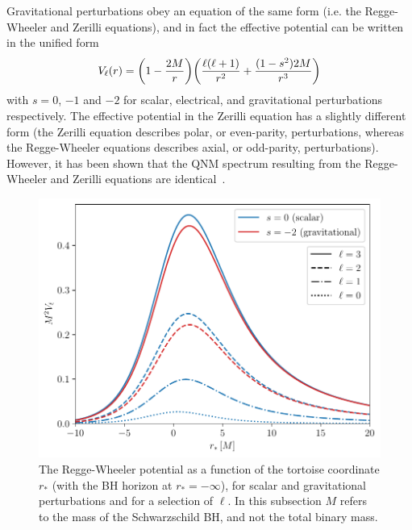Gravitational perturbations obey an equation of the same form (i.e. the Regge-Wheeler and Zerilli equations), and in fact the effective potential can be written in the unified form
\begin{equation}
    V_\ell(r) = \qty( 1 - \frac{2M}{r} ) \qty( \frac{\ell (\ell + 1)}{r^2} + \frac{(1 - s^2)2M}{r^3} )
\end{equation}
with $s = 0$, $-1$ and $-2$ for scalar, electrical, and gravitational perturbations respectively. 
The effective potential in the Zerilli equation has a slightly different form (the Zerilli equation describes polar, or even-parity, perturbations, whereas the Regge-Wheeler equations describes axial, or odd-parity, perturbations). 
However, it has been shown that the QNM spectrum resulting from the Regge-Wheeler and Zerilli equations are identical~\cite{Chandrasekhar:1975nkd}.

\begin{figure}[t]
    \centering
    \includegraphics[width=0.8\columnwidth]{Figures/Introduction/rw_potential.pdf}
    \caption[The Regge-Wheeler potential]{
    The Regge-Wheeler potential as a function of the tortoise coordinate $r_*$ (with the BH horizon at $r_* = -\infty$), for scalar and gravitational perturbations and for a selection of $\ell$. In this subsection $M$ refers to the mass of the Schwarzschild BH, and not the total binary mass.
    }
    \label{fig:rw_potential}
\end{figure}

